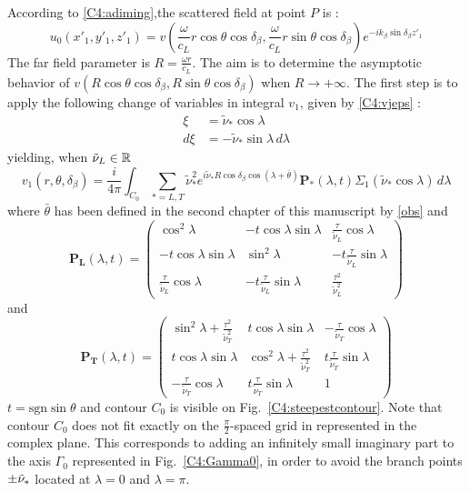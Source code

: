 According to \eqref{C4:adiming},the scattered field at point $P$ is :
\begin{equation}
u_0(x'_1,y'_1,z'_1)=v(\frac{\omega}{c_L}r\cos\theta\cos\delta_{\beta},\frac{\omega}{c_L}r\sin\theta\cos\delta_{\beta})e^{-ik_{\beta}\sin\delta_{\beta}z'_1}
\end{equation}
The far field parameter is $R=\frac{\omega r}{c_L}$. The aim is to determine the asymptotic behavior of $v(R\cos\theta\cos\delta_{\beta},R\sin\theta\cos\delta_{\beta})$ when $R\rightarrow +\infty$. The first step is to apply the following change of variables in integral $v_1$, given by \eqref{C4:vjeps} :
\begin{equation}
\begin{split}
\xi&=\tilde{\nu}_*\cos\lambda \\
d\xi&=-\tilde{\nu}_*\sin\lambda\, d\lambda
\end{split}
\label{C4:changevar2}
\end{equation}
yielding, when $\tilde{\nu}_L \in \mathbb{R}$
\begin{equation}
v_1(r,\theta,\delta_{\beta})=\frac{i}{4\pi} \int_{C_0}\sum_{*=L,T}\tilde{\nu}_*^2 e^{i\tilde{\nu}_*R\cos\delta_{\beta}\cos(\lambda+\bar{\theta})}\mathbf{ P_*}(\lambda,t)\Sigma_1(\tilde{\nu}_*\cos\lambda) \, d \lambda
\label{C4:v1C0}
\end{equation}
where $\bar{\theta}$ has been defined in the second chapter of this manuscript by \eqref{obs} and
\begin{equation}
\mathbf{P_L}(\lambda,t)=
\begin{pmatrix}
\cos^2\lambda & -t\cos\lambda\sin\lambda &\frac{\tau}{\tilde{\nu}_L} \cos\lambda \\
-t\cos\lambda\sin\lambda & \sin^2\lambda&-t\frac{\tau}{\tilde{\nu}_L}\sin\lambda \\
\frac{\tau}{\tilde{\nu}_L} \cos\lambda&-t\frac{\tau}{\tilde{\nu}_L}\sin\lambda&\frac{\tau^2}{\tilde{\nu}_L^2}
\end{pmatrix}
\end{equation}
and
\begin{equation}
\mathbf{P_T}(\lambda,t)=
\begin{pmatrix}
\sin^2\lambda+\frac{\tau^2}{\tilde{\nu}_T^2} & t\cos\lambda\sin\lambda &-\frac{\tau}{\tilde{\nu}_T}\cos\lambda \\
t\cos\lambda\sin\lambda & \cos^2\lambda+\frac{\tau^2}{\tilde{\nu}_T^2}&t\frac{\tau}{\tilde{\nu}_T}\sin\lambda \\
-\frac{\tau}{\tilde{\nu}_T}\cos\lambda&t\frac{\tau}{\tilde{\nu}_T}\sin\lambda&1
\end{pmatrix}
\end{equation}
$t=\mbox{sgn} \sin\theta$ and contour $C_0$ is visible on Fig.~\ref{C4:steepestcontour}. Note that contour $C_0$ does not fit exactly on the $\frac{\pi}{2}$-spaced grid in represented in the complex plane. This corresponds to adding an infinitely small imaginary part to the axis $\Gamma_0$ represented in Fig.~\ref{C4:Gamma0}, in order to avoid the branch points $\pm \tilde{\nu}_*$ located at $\lambda=0$ and $\lambda=\pi$.

